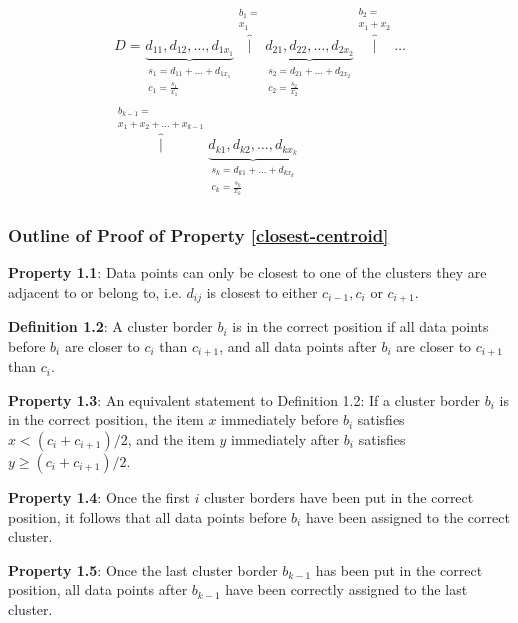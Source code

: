 \documentclass[conference,compsoc]{IEEEtran}
\begin{document}
\begin{equation}\label{alg-vis}\begin{aligned}
D=
\underbrace{d_{11}, d_{12}, \dots, d_{1x_1}}_{\substack{s_1 = d_{11} + \dots + d_{1x_1} \\  c_1 = \frac{s_1}{x_1}}}
\overbrace{|}^{\substack{b_1 = \\ x_1}}
\underbrace{d_{21}, d_{22}, \dots, d_{2x_2}}_{\substack{s_2 = d_{21} + \dots + d_{2x_2} \\  c_2 = \frac{s_2}{x_2}}}
\overbrace{|}^{\substack{b_2 = \\ x_1 + x_2}}
\dots \\
\overbrace{|}^{\substack{b_{k-1} = \\ x_1 + x_2 + \dots + x_{k-1}}}
\underbrace{d_{k1}, d_{k2}, \dots, d_{kx_k}}_{\substack{s_k = d_{k1} + \dots + d_{kx_k} \\  c_k = \frac{s_k}{x_k}}}
\end{aligned}
\end{equation}

\subsubsection{Outline of Proof of Property \ref{closest-centroid}}

\textbf{Property 1.1}: Data points can only be closest to one of the clusters they are adjacent to or belong to, i.e. $d_{ij}$ is closest to either $c_{i-1}, c_i$ or $c_{i+1}$.
    
\textbf{Definition 1.2}: A cluster border $b_i$ is in the correct position if all data points before $b_i$ are closer to $c_i$ than $c_{i+1}$, and all data points after $b_i$ are closer to $c_{i+1}$ than $c_i$.

\textbf{Property 1.3}: An equivalent statement to Definition 1.2: If a cluster border $b_i$ is in the correct position, the item $x$ immediately before $b_i$ satisfies $x < (c_i+c_{i+1})/2$, and the item $y$ immediately after $b_i$ satisfies $y \geq (c_i+c_{i+1})/2$.

\textbf{Property 1.4}: Once the first $i$ cluster borders have been put in the correct position, it follows that all data points before $b_i$ have been assigned to the correct cluster.

\textbf{Property 1.5}: Once the last cluster border $b_{k-1}$ has been put in the correct position, all data points after $b_{k-1}$ have been correctly assigned to the last cluster.
\end{document}
